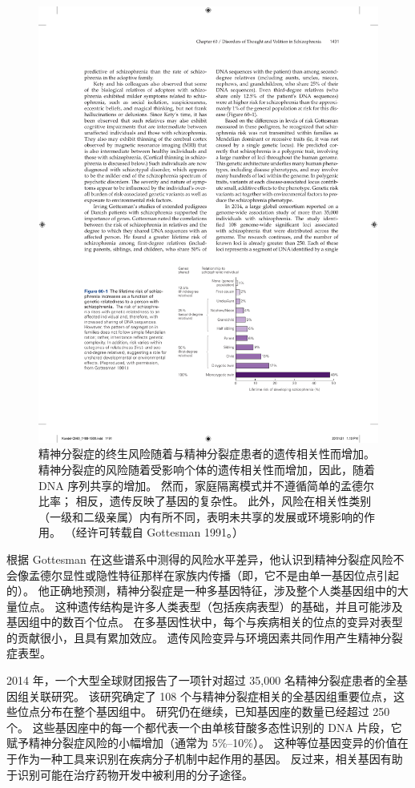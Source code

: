 \begin{figure}[htbp]
	\centering
	\includegraphics[width=0.7\linewidth]{chap60/fig_60_1}
	\caption{精神分裂症的终生风险随着与精神分裂症患者的遗传相关性而增加。 精神分裂症的风险随着受影响个体的遗传相关性而增加，因此，随着 DNA 序列共享的增加。 然而，家庭隔离模式并不遵循简单的孟德尔比率； 相反，遗传反映了基因的复杂性。 此外，风险在相关性类别（一级和二级亲属）内有所不同，表明未共享的发展或环境影响的作用。 （经许可转载自 Gottesman 1991。）}
	\label{fig:60_1}
\end{figure}


根据 Gottesman 在这些谱系中测得的风险水平差异，他认识到精神分裂症风险不会像孟德尔显性或隐性特征那样在家族内传播（即，它不是由单一基因位点引起的）。
他正确地预测，精神分裂症是一种多基因特征，涉及整个人类基因组中的大量位点。
这种遗传结构是许多人类表型（包括疾病表型）的基础，并且可能涉及基因组中的数百个位点。
在多基因性状中，每个与疾病相关的位点的变异对表型的贡献很小，且具有累加效应。
遗传风险变异与环境因素共同作用产生精神分裂症表型。


2014 年，一个大型全球财团报告了一项针对超过 35,000 名精神分裂症患者的全基因组关联研究。
该研究确定了 108 个与精神分裂症相关的全基因组重要位点，这些位点分布在整个基因组中。
研究仍在继续，已知基因座的数量已经超过 250 个。
这些基因座中的每一个都代表一个由单核苷酸多态性识别的 DNA 片段，它赋予精神分裂症风险的小幅增加（通常为 5\%–10\%）。
这种等位基因变异的价值在于作为一种工具来识别在疾病分子机制中起作用的基因。
反过来，相关基因有助于识别可能在治疗药物开发中被利用的分子途径。


